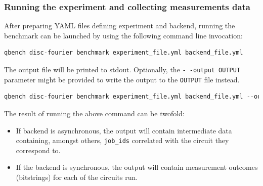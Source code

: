 \documentclass[preprint,12pt, a4paper, dvipsnames]{elsarticle}
\newcommand{\1}{{\rm 1\hspace{-0.9mm}l}}
\theoremstyle{definition}
\begin{document}
\subsubsection{Running the experiment and collecting measurements data}
After preparing YAML files defining experiment and backend,
running the benchmark can be launched by using the following command line invocation:
\begin{lstlisting}[language=Python]
qbench disc-fourier benchmark experiment_file.yml backend_file.yml
\end{lstlisting}
The output file will be printed to stdout. Optionally, the \texttt{- -output OUTPUT} parameter might be provided to write the output to the \texttt{OUTPUT} file instead.
\begin{lstlisting}[language=Python]
qbench disc-fourier benchmark experiment_file.yml backend_file.yml --output async_results.yml
\end{lstlisting}
The result of running the above command can be twofold:
\begin{itemize}
	\item If backend is asynchronous, the output will contain intermediate data containing, amongst others, \texttt{job\_ids} correlated with the circuit they correspond to.
	\item If the backend is synchronous, the output will contain measurement outcomes (bitstrings) for each of the circuits run.
\end{itemize}
\end{document}
